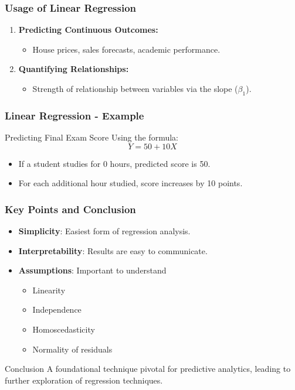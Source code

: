 \documentclass[aspectratio=169]{beamer}
\begin{document}
\begin{frame}[fragile]
    \frametitle{Usage of Linear Regression}
    \begin{enumerate}
        \item \textbf{Predicting Continuous Outcomes:}
            \begin{itemize}
                \item House prices, sales forecasts, academic performance.
            \end{itemize}
        \item \textbf{Quantifying Relationships:}
            \begin{itemize}
                \item Strength of relationship between variables via the slope ($\beta_1$).
            \end{itemize}
    \end{enumerate}
\end{frame}

\begin{frame}[fragile]
    \frametitle{Linear Regression - Example}
    \begin{block}{Predicting Final Exam Score}
        Using the formula:
        \begin{equation}
            Y = 50 + 10X 
        \end{equation}
        \begin{itemize}
            \item If a student studies for 0 hours, predicted score is 50.
            \item For each additional hour studied, score increases by 10 points.
        \end{itemize}
    \end{block}
\end{frame}

\begin{frame}[fragile]
    \frametitle{Key Points and Conclusion}
    \begin{itemize}
        \item \textbf{Simplicity}: Easiest form of regression analysis.
        \item \textbf{Interpretability}: Results are easy to communicate.
        \item \textbf{Assumptions}: Important to understand 
              \begin{itemize}
                  \item Linearity
                  \item Independence
                  \item Homoscedasticity
                  \item Normality of residuals
              \end{itemize}
    \end{itemize}
    \begin{block}{Conclusion}
        A foundational technique pivotal for predictive analytics, leading to further exploration of regression techniques.
    \end{block}
\end{frame}
\end{document}

